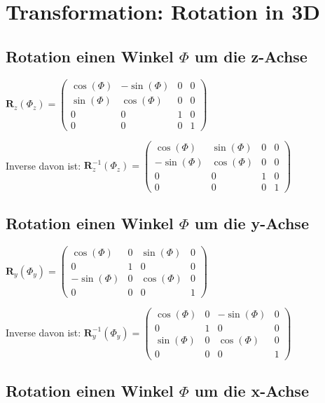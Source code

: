\section{Transformation: Rotation in 3D}

\subsection{Rotation einen Winkel $\Phi$ um die z-Achse}

$\textbf{R}_z(\Phi_z) = \begin{pmatrix}
\cos (\Phi) & -\sin (\Phi) & 0 & 0\\
\sin (\Phi) & \cos (\Phi) & 0 & 0\\
0 & 0 & 1 & 0\\
0 & 0 & 0 & 1
\end{pmatrix}$

Inverse davon ist:
$\textbf{R}_z^{-1}(\Phi_z) = \begin{pmatrix}
\cos (\Phi) & \sin (\Phi) & 0 & 0\\
-\sin (\Phi) & \cos (\Phi) & 0 & 0\\
0 & 0 & 1 & 0\\
0 & 0 & 0 & 1
\end{pmatrix}$

\subsection{Rotation einen Winkel $\Phi$ um die y-Achse}

$\textbf{R}_y(\Phi_y) = \begin{pmatrix}
\cos (\Phi) & 0 & \sin (\Phi) & 0\\
0 & 1 & 0 & 0\\
-\sin (\Phi) & 0 & \cos (\Phi) & 0\\
0 & 0 & 0 & 1
\end{pmatrix}$

Inverse davon ist:
$\textbf{R}_y^{-1}(\Phi_y) = \begin{pmatrix}
\cos (\Phi) & 0 & -\sin (\Phi) & 0\\
0 & 1 & 0 & 0\\
\sin (\Phi) & 0 & \cos (\Phi) & 0\\
0 & 0 & 0 & 1
\end{pmatrix}$

\subsection{Rotation einen Winkel $\Phi$ um die x-Achse}

